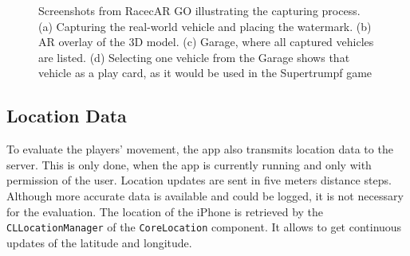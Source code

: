 \begin{figure}[btph]
        \caption[Screenshots from RacecAR GO illustrating the capturing process. (a) Capturing the real-world vehicle and placing the watermark. (b) AR overlay of the 3D model. (c) Garage, where all captured vehicles are listed. (d) Selecting one vehicle from the Garage shows that vehicle as a play card, as it would be used in the Supertrumpf game]{Screenshots from RacecAR GO illustrating the capturing process. (a) Capturing the real-world vehicle and placing the watermark. (b) AR overlay of the 3D model. (c) Garage, where all captured vehicles are listed. (d) Selecting one vehicle from the Garage shows that vehicle as a play card, as it would be used in the Supertrumpf game}
\label{fig:capturingScreenshots}
\end{figure}

\subsection{Location Data}\label{sec:locationTracking}
To evaluate the players' movement, the app also transmits location data to the server. This is only done, when the app is currently running and only with permission of the user. Location updates are sent in five meters distance steps. Although more accurate data is available and could be logged, it is not necessary for the evaluation. The location of the iPhone is retrieved by the \texttt{CLLocationManager} of the \texttt{CoreLocation} component. It allows to get continuous updates of the latitude and longitude.






